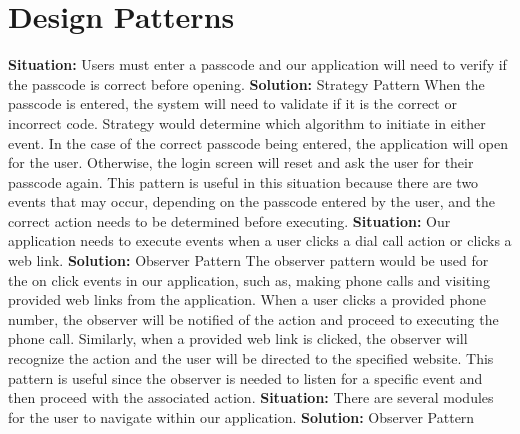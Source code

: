 \documentclass[letterpaper,12pt,titlepage]{article}
\begin{document}
\newpage
\section{Design Patterns}
\textbf{Situation: }Users must enter a passcode and our application will need to verify if the passcode is correct before opening.
\noindent
\newline
\newline
\textbf{Solution: }Strategy Pattern
\noindent
\newline
\newline
When the passcode is entered, the system will need to validate if it is the correct or incorrect code. Strategy would determine which algorithm to initiate in either event. In the case of the correct passcode being entered, the application will open for the user. Otherwise, the login screen will reset and ask the user for their passcode again. This pattern is useful in this situation because there are two events that may occur, depending on the passcode entered by the user, and the correct action needs to be determined before executing.
\noindent
\newline
\newline
\textbf{Situation: }Our application needs to execute events when a user clicks a dial call action or clicks a web link.
\noindent
\newline
\newline
\textbf{Solution:} Observer Pattern
\noindent
\newline
\newline
The observer pattern would be used for the on click events in our application, such as, making phone calls and visiting provided web links from the application. When a user clicks a provided phone number, the observer will be notified of the action and proceed to executing the phone call. Similarly, when a provided web link is clicked, the observer will recognize the action and the user will be directed to the specified website. This pattern is useful since the observer is needed to listen for a specific event and then proceed with the associated action.
\newline
\newline
\noindent
\textbf{Situation: }There are several modules for the user to navigate within our application.
\newline
\newline
\noindent
\textbf{Solution: }Observer Pattern
\newline
\newline
\end{document}
